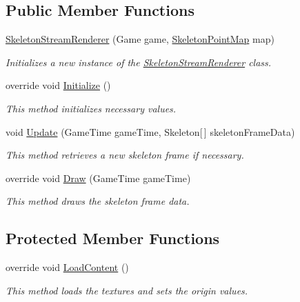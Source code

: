 \subsection*{Public Member Functions}
\begin{DoxyCompactItemize}
\item 
\hyperlink{class_microsoft_1_1_samples_1_1_kinect_1_1_avateering_1_1_skeleton_stream_renderer_af0974bf772920b91479aab6a2038ec8c}{Skeleton\+Stream\+Renderer} (Game game, \hyperlink{namespace_microsoft_1_1_samples_1_1_kinect_1_1_avateering_ae8146e6f856d793f4fe4030a7a50a9d1}{Skeleton\+Point\+Map} map)
\begin{DoxyCompactList}\small\item\em Initializes a new instance of the \hyperlink{class_microsoft_1_1_samples_1_1_kinect_1_1_avateering_1_1_skeleton_stream_renderer}{Skeleton\+Stream\+Renderer} class. \end{DoxyCompactList}\item 
override void \hyperlink{class_microsoft_1_1_samples_1_1_kinect_1_1_avateering_1_1_skeleton_stream_renderer_af47e90f667253a9c1bd3116f607c69fd}{Initialize} ()
\begin{DoxyCompactList}\small\item\em This method initializes necessary values. \end{DoxyCompactList}\item 
void \hyperlink{class_microsoft_1_1_samples_1_1_kinect_1_1_avateering_1_1_skeleton_stream_renderer_a9beca14a74f9e496756a97f828364149}{Update} (Game\+Time game\+Time, Skeleton\mbox{[}$\,$\mbox{]} skeleton\+Frame\+Data)
\begin{DoxyCompactList}\small\item\em This method retrieves a new skeleton frame if necessary. \end{DoxyCompactList}\item 
override void \hyperlink{class_microsoft_1_1_samples_1_1_kinect_1_1_avateering_1_1_skeleton_stream_renderer_a3c07b064603a3a47dbcd968b9972e41d}{Draw} (Game\+Time game\+Time)
\begin{DoxyCompactList}\small\item\em This method draws the skeleton frame data. \end{DoxyCompactList}\end{DoxyCompactItemize}
\subsection*{Protected Member Functions}
\begin{DoxyCompactItemize}
\item 
override void \hyperlink{class_microsoft_1_1_samples_1_1_kinect_1_1_avateering_1_1_skeleton_stream_renderer_abc25b8c3f2cb598c5c4e59b9dbea1785}{Load\+Content} ()
\begin{DoxyCompactList}\small\item\em This method loads the textures and sets the origin values. \end{DoxyCompactList}\end{DoxyCompactItemize}
